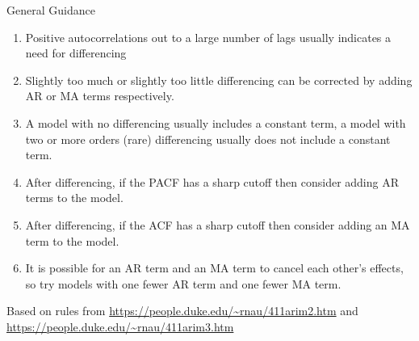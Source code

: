 \documentclass[11pt,ignorenonframetext,]{beamer}
\begin{document}
\begin{frame}[t]{General Guidance}
\protect\hypertarget{general-guidance}{}

\begin{enumerate}
\item
  Positive autocorrelations out to a large number of lags usually
  indicates a need for differencing
\item
  Slightly too much or slightly too little differencing can be corrected
  by adding AR or MA terms respectively.
\item
  A model with no differencing usually includes a constant term, a model
  with two or more orders (rare) differencing usually does not include a
  constant term.
\item
  After differencing, if the PACF has a sharp cutoff then consider
  adding AR terms to the model.
\item
  After differencing, if the ACF has a sharp cutoff then consider adding
  an MA term to the model.
\item
  It is possible for an AR term and an MA term to cancel each other's
  effects, so try models with one fewer AR term and one fewer MA term.
\end{enumerate}

\scriptsize{Based on rules from \url{https://people.duke.edu/~rnau/411arim2.htm} and \url{https://people.duke.edu/~rnau/411arim3.htm}}

\end{frame}
\end{document}
